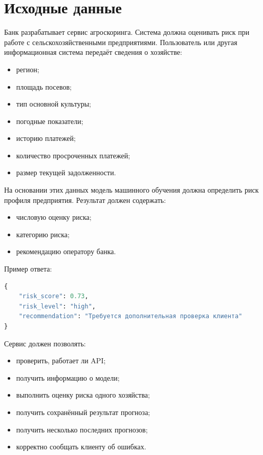 \documentclass[12pt,a4paper]{article}
\begin{document}
\section{Исходные данные}

Банк разрабатывает сервис агроскоринга. Система должна оценивать риск при работе с сельскохозяйственными предприятиями. Пользователь или другая информационная система передаёт сведения о хозяйстве:

\begin{itemize}
    \item регион;
    \item площадь посевов;
    \item тип основной культуры;
    \item погодные показатели;
    \item историю платежей;
    \item количество просроченных платежей;
    \item размер текущей задолженности.
\end{itemize}

На основании этих данных модель машинного обучения должна определить риск профиля предприятия. Результат должен содержать:

\begin{itemize}
    \item числовую оценку риска;
    \item категорию риска;
    \item рекомендацию оператору банка.
\end{itemize}

Пример ответа:

\begin{lstlisting}[language=Python, caption={Пример ответа /predict}]
{
    "risk_score": 0.73,
    "risk_level": "high",
    "recommendation": "Требуется дополнительная проверка клиента"
}
\end{lstlisting}

Сервис должен позволять:

\begin{itemize}
    \item проверить, работает ли API;
    \item получить информацию о модели;
    \item выполнить оценку риска одного хозяйства;
    \item получить сохранённый результат прогноза;
    \item получить несколько последних прогнозов;
    \item корректно сообщать клиенту об ошибках.
\end{itemize}
\end{document}
